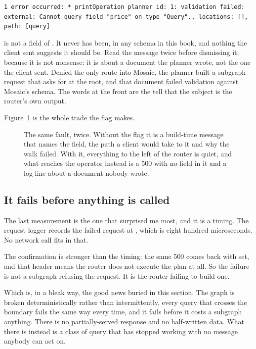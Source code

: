 \begin{verbatim}
1 error occurred: * printOperation planner id: 1: validation failed: external: Cannot query field "price" on type "Query"., locations: [], path: [query]
\end{verbatim}

%
 is not a field of . It never has been, in any schema in
this book, and nothing the client sent suggests it should be. Read the message
twice before dismissing it, because it is not nonsense: it is about a document
the planner wrote, not the one the client sent. Denied the only route into
Mosaic, the planner built a subgraph request that asks for  at the
root, and that document failed validation against Mosaic's schema. The words
 at the front are the tell that the subject is the
router's own output.

Figure~\ref{fig:ch10-where-the-failure-went} is the whole trade the flag makes.

\begin{figure}[htbp]
  \centering
  
  \caption{The same fault, twice. Without the flag it is a build-time message
  that names the field, the path a client would take to it and why the walk
  failed. With it, everything to the left of the router is quiet, and what
  reaches the operator instead is a 500 with no field in it and a log line about
  a document nobody wrote.}
  \label{fig:ch10-where-the-failure-went}
\end{figure}

\subsection*{It fails before anything is called}

%
The last measurement is the one that surprised me most, and it is a timing. The
request logger records the failed request at ,
which is eight hundred microseconds. No network call fits in that.

The confirmation is stronger than the timing: the same 500 comes back with
 set, and that header means the router does not
execute the plan at all. So the failure is not a subgraph refusing the request.
It is the router failing to build one.

Which is, in a bleak way, the good news buried in this section. The graph is
broken deterministically rather than intermittently, every query that crosses
the boundary fails the same way every time, and it fails before it costs a
subgraph anything. There is no partially-served response and no half-written
data. What there is instead is a class of query that has stopped working with no
message anybody can act on.

